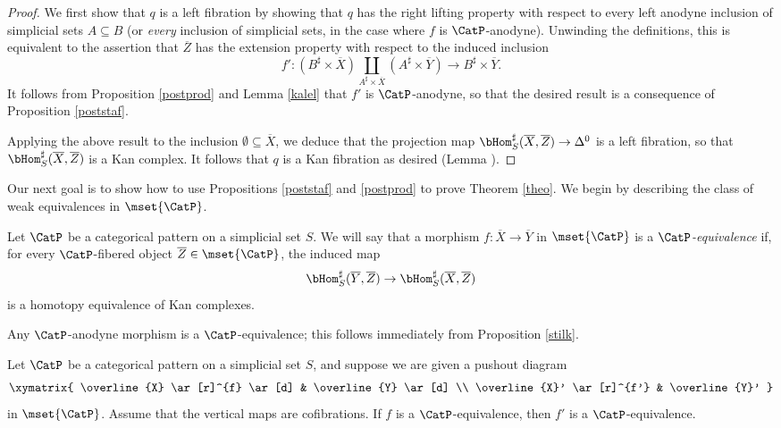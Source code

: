 \begin{proof}
We first show that $q$ is a left fibration by showing that $q$ has the right lifting property with respect to every left anodyne inclusion  of simplicial sets $A \subseteq B$ (or {\em every} inclusion of simplicial sets, in the case where
$f$ is $\CatP$-anodyne). Unwinding the definitions, this is equivalent to the assertion that $\overline{Z}$ has the extension property with respect to the induced inclusion
$$f': (B^{\sharp} \times \overline{X} ) \coprod_{ A^{\sharp} \times \overline{X} }( A^{\sharp} \times \overline{Y}) \rightarrow B^{\sharp} \times \overline{Y}.$$
It follows from Proposition \ref{postprod} and Lemma \ref{kalel} that $f'$ is $\CatP$-anodyne, so that the desired result  is a consequence of Proposition \ref{poststaf}.

Applying the above result to the inclusion $\emptyset \subseteq \overline{X}$, we deduce that
the projection map $\bHom^{\sharp}_{S}( \overline{X}, \overline{Z} ) \rightarrow \Delta^0$ is
a left fibration, so that $\bHom^{\sharp}_{S}( \overline{X}, \overline{Z} )$ is a Kan complex.
It follows that $q$ is a Kan fibration as desired (Lemma ).
\end{proof}

Our next goal is to show how to use Propositions \ref{poststaf} and \ref{postprod} to prove Theorem \ref{theo}. We begin by describing the class of weak equivalences in $\mset{ \CatP}$.

\begin{definition}
Let $\CatP$ be a categorical pattern on a simplicial set $S$. We will say that a morphism $f: \overline{X} \rightarrow \overline{Y}$ in $\mset{ \CatP}$ is a {\it $\CatP$-equivalence} if, for every $\CatP$-fibered object $\overline{Z} \in \mset{ \CatP}$, the induced map
$$ \bHom^{\sharp}_{S}( \overline{Y}, \overline{Z}) \rightarrow \bHom^{\sharp}_{S}( \overline{X}, \overline{Z} )$$
is a homotopy equivalence of Kan complexes.
\end{definition}

\begin{example}\label{inker}
Any $\CatP$-anodyne morphism is a $\CatP$-equivalence; this follows immediately
from Proposition \ref{stilk}.
\end{example}

\begin{lemma}\label{caker}
Let $\CatP$ be a categorical pattern on a simplicial set $S$, and suppose we are given a pushout diagram $$ \xymatrix{ \overline{X} \ar[r]^{f} \ar[d] & \overline{Y} \ar[d] \\
\overline{X}' \ar[r]^{f'} & \overline{Y}' }$$
in $\mset{ \CatP}$. Assume that the vertical maps are cofibrations. If $f$ is a $\CatP$-equivalence,
then $f'$ is a $\CatP$-equivalence.
\end{lemma}

